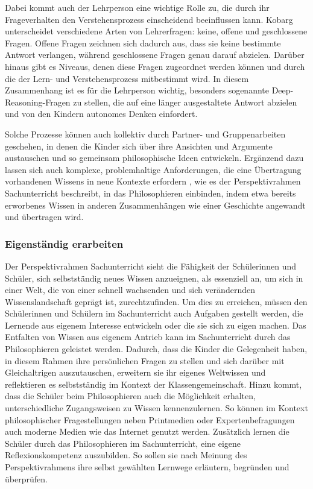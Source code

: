 Dabei kommt auch der Lehrperson eine wichtige Rolle zu, die durch ihr Frageverhalten den Verstehensprozess einscheidend beeinflussen kann. 
Kobarg unterscheidet verschiedene Arten von Lehrerfragen: keine, offene und geschlossene Fragen. 
Offene Fragen zeichnen sich dadurch aus, dass sie keine bestimmte Antwort verlangen, während geschlossene Fragen genau darauf abzielen. 
Darüber hinaus gibt es Niveaus, denen diese Fragen zugeordnet werden können\cite[S.\,22]{HB15} und durch die der Lern- und Verstehensprozess mitbestimmt wird.
In diesem Zusammenhang ist es für die Lehrperson wichtig, besonders sogenannte \glqq Deep-Reasoning\grqq{}-Fragen zu stellen, die auf eine länger ausgestaltete Antwort abzielen und von den Kindern autonomes Denken einfordert. 

Solche Prozesse können auch kollektiv durch Partner- und Gruppenarbeiten geschehen, in denen die Kinder sich über ihre Ansichten und Argumente austauschen und so gemeinsam philosophische Ideen entwickeln. 
Ergänzend dazu lassen sich auch \glqq komplexe, problemhaltige Anforderungen, die eine Übertragung vorhandenen Wissens in neue Kontexte erfordern\grqq{} \cite[S.\,21]{GDS13}, wie es der Perspektivrahmen Sachunterricht beschreibt, in das Philosophieren einbinden, indem etwa bereits erworbenes Wissen in anderen Zusammenhängen wie einer Geschichte angewandt und übertragen wird. 

\newpage

\subsubsection{Eigenständig erarbeiten}


Der Perspektivrahmen Sachunterricht sieht die Fähigkeit der Schülerinnen und Schüler, sich selbstständig neues Wissen anzueignen, als essenziell an, um sich in einer Welt, die von einer schnell wachsenden und sich verändernden Wissenslandschaft geprägt ist, zurechtzufinden. 
Um dies zu erreichen, müssen den Schülerinnen und Schülern im Sachunterricht auch Aufgaben gestellt werden, \glqq die Lernende aus eigenem Interesse entwickeln oder die sie sich zu eigen machen.\grqq{} \cite[S.\,22]{GDS13}
Das Entfalten von Wissen aus eigenem Antrieb kann im Sachunterricht durch das Philosophieren geleistet werden. 
Dadurch, dass die Kinder die Gelegenheit haben, in diesem Rahmen ihre persönlichen Fragen zu stellen und sich darüber mit Gleichaltrigen auszutauschen, erweitern sie ihr eigenes Weltwissen und reflektieren es selbstständig im Kontext der Klassengemeinschaft. 
Hinzu kommt, dass die Schüler beim Philosophieren auch die Möglichkeit erhalten, unterschiedliche Zugangsweisen zu Wissen kennenzulernen. 
So können im Kontext philosophischer Fragestellungen neben Printmedien oder Expertenbefragungen auch moderne Medien wie das Internet genutzt werden.
Zusätzlich lernen die Schüler durch das Philosophieren im Sachunterricht, eine eigene Reflexionskompetenz auszubilden. 
So sollen sie nach Meinung des Perspektivrahmens \glqq ihre selbst gewählten Lernwege erläutern, begründen und überprüfen.\grqq{} \cite[S.\,23]{GDS13}


